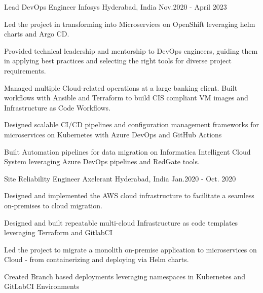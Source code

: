 \begin{cventries}
\vspace{1\baselineskip}
  \cventry
    { Lead DevOps Engineer } %
    {Infosys} %
    {Hyderabad, India} %
    {Nov.2020 - April 2023 } %
    {
      \begin{cvitems} %
        \item {Led the project in transforming into Microservices on OpenShift leveraging helm charts and Argo CD.}
        \item {Provided technical leadership and mentorship to DevOps engineers, guiding them in applying best practices and selecting the right tools for diverse project requirements. }
        \item {Managed multiple Cloud-related operations at a large banking client. Built workflows with Ansible and Terraform to build CIS compliant VM images and Infrastructure as Code Workflows. }
        \item {Designed scalable CI/CD pipelines and configuration management frameworks for microservices on Kubernetes with Azure DevOps and GitHub Actions}
        \item {Built Automation pipelines for data migration on Informatica Intelligent Cloud System leveraging Azure DevOps pipelines and RedGate tools.}
      \end{cvitems}
    }
\vspace{1\baselineskip}
  \cventry
    { Site Reliability Engineer } %
    {Axelerant} %
    {Hyderabad, India} %
    {Jan.2020 - Oct. 2020 } %
    {
      \begin{cvitems} %
        \item {Designed and implemented the AWS cloud infrastructure to facilitate a seamless on-premises to cloud migration. } 
        \item {Designed and built repeatable multi-cloud Infrastructure as code templates leveraging Terraform and GitlabCI}
        \item {Led the project to migrate a monolith on-premise application to microservices on Cloud - from containerizing and deploying via Helm charts. }
        \item {Created Branch based deployments leveraging namespaces in Kubernetes and GitLabCI Environments}
      \end{cvitems}
}
\end{cventries}
